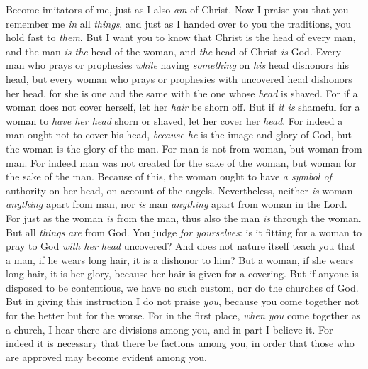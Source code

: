 \begin{biblechapter} %
 Become imitators of me, just as I also \textit{am} of Christ.
\verse Now I praise you that you remember me \textit{in} all \textit{things}, and just as I handed over to you the traditions, you hold fast to \textit{them}.
\verse But I want you to know that Christ is the head of every man, and the man \textit{is the} head of the woman, and \textit{the} head of Christ \textit{is} God.
\verse Every man who prays or prophesies \textit{while} having \textit{something} on \textit{his} head dishonors his head,
\verse but every woman who prays or prophesies with uncovered head dishonors her head, for she is one and the same with the one whose \textit{head} is shaved.
\verse For if a woman does not cover herself, let her \textit{hair} be shorn off. But if \textit{it is} shameful for a woman to \textit{have her head} shorn or shaved, let her cover her \textit{head}.
\verse For indeed a man ought not to cover his head, \textit{because he} is the image and glory of God, but the woman is the glory of the man.
\verse For man is not from woman, but woman from man.
\verse For indeed man was not created for the sake of the woman, but woman for the sake of the man.
\verse Because of this, the woman ought to have \textit{a symbol of} authority on her head, on account of the angels.
\verse Nevertheless, neither \textit{is} woman \textit{anything} apart from man, nor \textit{is} man \textit{anything} apart from woman in the Lord.
\verse For just as the woman \textit{is} from the man, thus also the man \textit{is} through the woman. But all \textit{things} \textit{are} from God.
\verse You judge \textit{for yourselves}: is it fitting for a woman to pray to God \textit{with her head} uncovered?
\verse And does not nature itself teach you that a man, if he wears long hair, it is a dishonor to him?
\verse But a woman, if she wears long hair, it is her glory, because her hair is given for a covering.
\verse But if anyone is disposed to be contentious, we have no such custom, nor do the churches of God.
 But in giving this instruction I do not praise \textit{you}, because you come together not for the better but for the worse.
\verse For in the first place, \textit{when you} come together as a church, I hear there are divisions among you, and in part I believe it.
\verse For indeed it is necessary that there be factions among you, in order that those who are approved may become evident among you.

\end{biblechapter}
